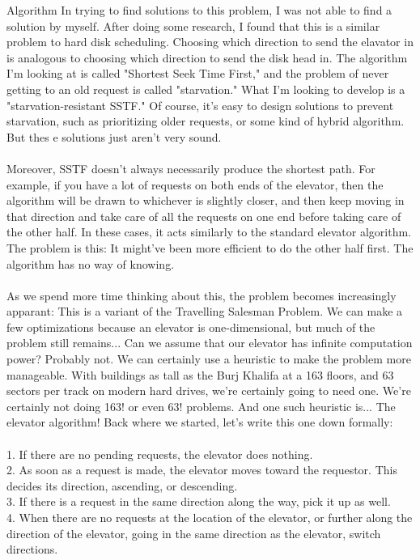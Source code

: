 \documentclass[10pt]{article}
\begin{document}
\begin{section}{Algorithm}
In trying to find solutions to this problem, I was not able to find a solution by myself. After doing some research, I found that this is a similar problem to hard disk scheduling. Choosing which direction to send the elavator in is analogous to choosing which direction to send the disk head in. The algorithm I'm looking at is called "Shortest Seek Time First," and the problem of never getting to an old request is called "starvation." What I'm looking to develop is a "starvation-resistant SSTF." Of course, it's easy to design solutions to prevent starvation, such as prioritizing older requests, or some kind of hybrid algorithm. But thes e solutions just aren't very sound.\\
\\
Moreover, SSTF doesn't always necessarily produce the shortest path. For example, if you have a lot of requests on both ends of the elevator, then the algorithm will be drawn to whichever is slightly closer, and then keep moving in that direction and take care of all the requests on one end before taking care of the other half. In these cases, it acts similarly to the standard elevator algorithm. The problem is this: It might've been more efficient to do the other half first. The algorithm has no way of knowing.\\
\\
As we spend more time thinking about this, the problem becomes increasingly apparant: This is a variant of the Travelling Salesman Problem. We can make a few optimizations because an elevator is one-dimensional, but much of the problem still remains... Can we assume that our elevator has infinite computation power? Probably not. We can certainly use a heuristic to make the problem more manageable. With buildings as tall as the Burj Khalifa at a 163 floors, and 63 sectors per track on modern hard drives, we're certainly going to need one. We're certainly not doing 163! or even 63! problems. And one such heuristic is... The elevator algorithm! Back where we started, let's write this one down formally:\\
\\
1. If there are no pending requests, the elevator does nothing.\\
2. As soon as a request is made, the elevator moves toward the requestor. This decides its direction, ascending, or descending.\\
3. If there is a request in the same direction along the way, pick it up as well.\\
4. When there are no requests at the location of the elevator, or further along the direction of the elevator, going in the same direction as the elevator, switch directions.\\

\end{section}
\end{document}
